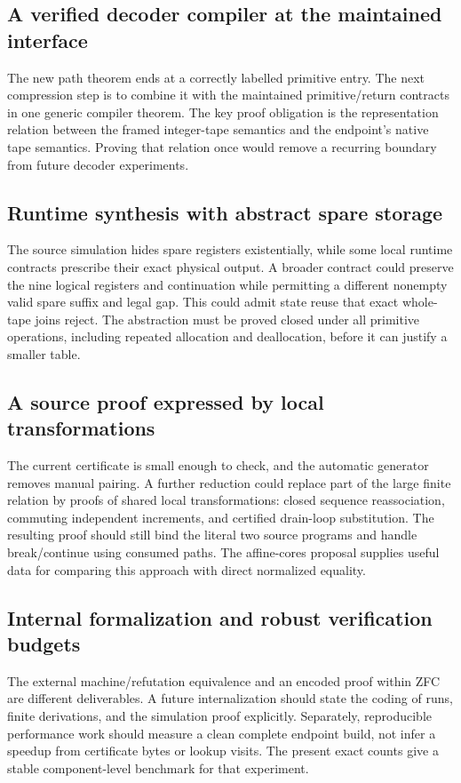 \documentclass[11pt,letterpaper]{article}
\begin{document}
\subsection{A verified decoder compiler at the maintained interface}
The new path theorem ends at a correctly labelled primitive entry. The next compression step is to combine it with the maintained primitive/return contracts in one generic compiler theorem. The key proof obligation is the representation relation between the framed integer-tape semantics and the endpoint's native tape semantics. Proving that relation once would remove a recurring boundary from future decoder experiments.

\subsection{Runtime synthesis with abstract spare storage}
The source simulation hides spare registers existentially, while some local runtime contracts prescribe their exact physical output. A broader contract could preserve the nine logical registers and continuation while permitting a different nonempty valid spare suffix and legal gap. This could admit state reuse that exact whole-tape joins reject. The abstraction must be proved closed under all primitive operations, including repeated allocation and deallocation, before it can justify a smaller table.

\subsection{A source proof expressed by local transformations}
The current certificate is small enough to check, and the automatic generator removes manual pairing. A further reduction could replace part of the large finite relation by proofs of shared local transformations: closed sequence reassociation, commuting independent increments, and certified drain-loop substitution. The resulting proof should still bind the literal two source programs and handle break/continue using consumed paths. The affine-cores proposal supplies useful data for comparing this approach with direct normalized equality.

\subsection{Internal formalization and robust verification budgets}
The external machine/refutation equivalence and an encoded proof within ZFC are different deliverables. A future internalization should state the coding of runs, finite derivations, and the simulation proof explicitly. Separately, reproducible performance work should measure a clean complete endpoint build, not infer a speedup from certificate bytes or lookup visits. The present exact counts give a stable component-level benchmark for that experiment.
\end{document}
